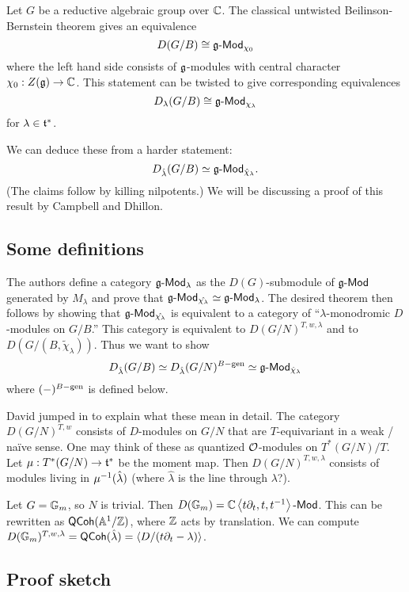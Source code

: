 \documentclass{article}
\begin{document}
Let $G$ be a reductive algebraic group over $\mathbb{C}$.
The classical untwisted Beilinson-Bernstein theorem gives an equivalence
\[
	D(G/B) \cong \mathfrak{g}\text{-}\mathsf{Mod}_{\chi_0}
\]
where the left hand side consists of $\mathfrak{g}$-modules with central character $\chi_0: Z(\mathfrak{g}) \to \mathbb{C}$.
This statement can be twisted to give corresponding equivalences
\[
	D_\lambda(G/B) \cong \mathfrak{g}\text{-}\mathsf{Mod}_{\chi_\lambda}
\]
for $\lambda \in \mathfrak{t}^*$.

We can deduce these from a harder statement:
\[
	D_{\hat{\lambda}}(G/B) \simeq \mathfrak{g}\text{-}\mathsf{Mod}_{\hat{\chi}_\lambda}.
\]
(The claims follow by killing nilpotents.)
We will be discussing a proof of this result by Campbell and Dhillon.

\subsection{Some definitions}

The authors define a category $\mathfrak{g}\text{-}\mathsf{Mod}_\lambda$ as the $D(G)$-submodule of $\mathfrak{g}\text{-}\mathsf{Mod}$ generated by $M_\lambda$ and prove that $\mathfrak{g}\text{-}\mathsf{Mod}_{\hat{\chi_\lambda}} \simeq \mathfrak{g}\text{-}\mathsf{Mod}_\lambda$.
The desired theorem then follows by showing that $\mathfrak{g}\text{-}\mathsf{Mod}_{\hat{\chi_\lambda}}$ is equivalent to a category of ``$\lambda$-monodromic $D$-modules on $G / B$.''
This category is equivalent to $D(G/N)^{T,w,\lambda}$ and to $D(G/(B,\tilde{\chi}_\lambda))$.
Thus we want to show
\[
	D_{\hat{\lambda}}(G/B) \simeq D_{\hat{\lambda}}(G/N)^{B\mathrm{-gen}} \simeq \mathfrak{g}\text{-}\mathsf{Mod}_{\hat{\chi}_\lambda}
\]
where $(-)^{B\mathrm{-gen}}$ is defined below.

David jumped in to explain what these mean in detail.
The category $D(G/N)^{T,w}$ consists of $D$-modules on $G/N$ that are $T$-equivariant in a weak / na\"ive sense.
One may think of these as quantized $\mathcal{O}$-modules on $T^*(G/N) / T$.
Let $\mu: T^*(G/N) \to \mathfrak{t}^*$ be the moment map.
Then $D(G/N)^{T,w,\lambda}$ consists of modules living in $\mu^{-1}(\hat{\lambda})$ (where $\hat{\lambda}$ is the line through $\lambda$?).

\begin{ex}
	Let $G = \mathbb{G}_m$, so $N$ is trivial.
	Then $D(\mathbb{G}_m) = \mathbb{C}\left\langle t \partial_t, t, t^{-1} \right\rangle\text{-}\mathsf{Mod}$.
	This can be rewritten as $\mathsf{QCoh}(\mathbb{A}^1 / \mathbb{Z})$, where $\mathbb{Z}$ acts by translation.
	We can compute $D(\mathbb{G}_m)^{T,w,\lambda} = \mathsf{QCoh}(\hat{\lambda}) = \left\langle D / (t \partial_t - \lambda) \right\rangle$.
\end{ex}

\subsection{Proof sketch}
\end{document}
